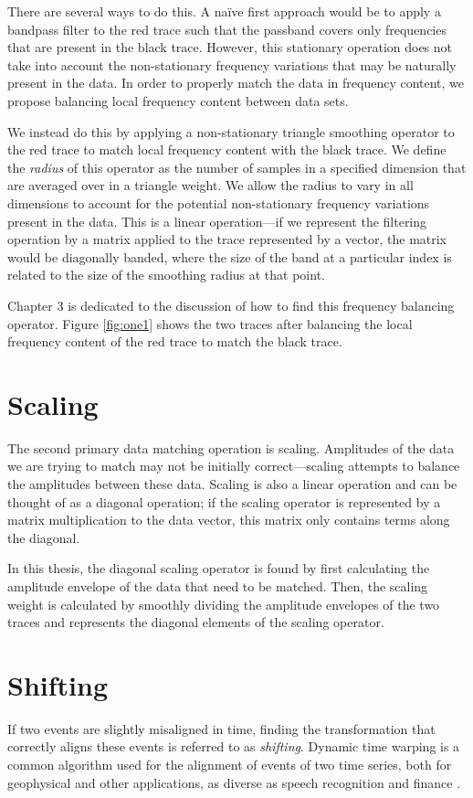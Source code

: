There are several ways to do this.
A na\"ive first approach would be to apply a bandpass filter to the red trace such that the passband covers only frequencies that are present in the black trace.
However, this stationary operation does not take into account the non-stationary frequency variations that may be naturally present in the data.
In order to properly match the data in frequency content, we propose balancing local frequency content between data sets.

We instead do this by applying a non-stationary triangle smoothing operator to the red trace to match local frequency content with the black trace.
We define the {\em radius} of this operator as the number of samples in a specified dimension that are averaged over in a triangle weight.
We allow the radius to vary in all dimensions to account for the potential non-stationary frequency variations present in the data.
This is a linear operation---if we represent the filtering operation by a matrix applied to the trace represented by a vector, the matrix would be diagonally banded, where the size of the band at a particular index is related to the size of the smoothing radius at that point.

Chapter 3 is dedicated to the discussion of how to find this frequency balancing operator.
Figure \ref{fig:one1} shows the two traces after balancing the local frequency content of the red trace to match the black trace.


\section{Scaling}
The second primary data matching operation is scaling. 
Amplitudes of the data we are trying to match may not be initially correct---scaling attempts to balance the amplitudes between these data.
Scaling is also a linear operation and can be thought of as a diagonal operation; if the scaling operator is represented by a matrix multiplication to the data vector, this matrix only contains terms along the diagonal.

In this thesis, the diagonal scaling operator is found by first calculating the amplitude envelope of the data that need to be matched.
Then, the scaling weight is calculated by smoothly dividing the amplitude envelopes of the two traces and represents the diagonal elements of the scaling operator.

\section{Shifting}
If two events are slightly misaligned in time, finding the transformation that correctly aligns these events is referred to as {\em shifting}.
Dynamic time warping is a common algorithm used for the alignment of events of two time series, both for geophysical and other applications, as diverse as speech recognition and finance \cite[]{herrera2012,hale2013,dtw,finance}.

